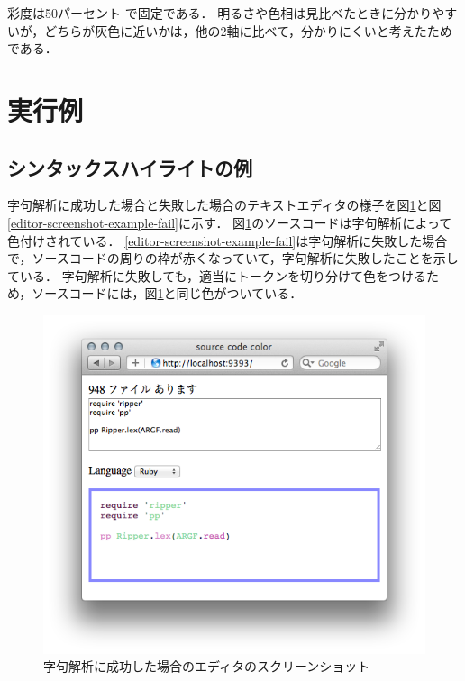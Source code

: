 \documentclass{cs-thesis}
\begin{document}
  彩度は50パーセント で固定である．
  明るさや色相は見比べたときに分かりやすいが，どちらが灰色に近いかは，他の2軸に比べて，分かりにくいと考えたためである．




 \clearpage
  \section{実行例}


  \subsection{シンタックスハイライトの例}
  字句解析に成功した場合と失敗した場合のテキストエディタの様子を図\ref{editor-screenshot-example}と図\ref{editor-screenshot-example-fail}に示す．
  図\ref{editor-screenshot-example}のソースコードは字句解析によって色付けされている．
  \ref{editor-screenshot-example-fail}は字句解析に失敗した場合で，ソースコードの周りの枠が赤くなっていて，字句解析に失敗したことを示している．
  字句解析に失敗しても，適当にトークンを切り分けて色をつけるため，ソースコードには，図\ref{editor-screenshot-example}と同じ色がついている．

  \begin{figure}[htbp]
   \centering
   \includegraphics[scale=0.8]{editor-screenshot-example.png}
   \caption{字句解析に成功した場合のエディタのスクリーンショット}
   \label{editor-screenshot-example}
  \end{figure}
\end{document}

